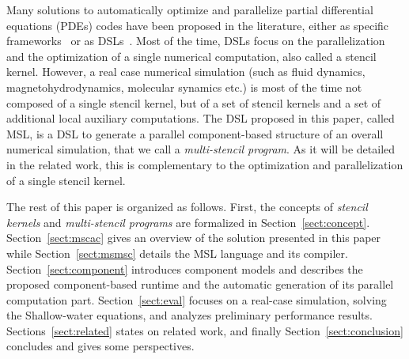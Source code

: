 Many solutions to automatically optimize and parallelize partial differential equations (PDEs) codes have been proposed in the literature, either as specific frameworks~\cite{CPE:CPE3494,Trilinos-Overview,petsc-efficient} or as DSLs~\cite{spaaTangCKLL11,citeulike12258902,Giles2011,DeVito2011LDS}. Most of the time, DSLs focus on the parallelization and the optimization of a single numerical computation, also called a stencil kernel.
However, a real case numerical simulation (such as fluid dynamics, magnetohydrodynamics, molecular synamics etc.) is most of the time not composed of a single stencil kernel, but of a set of stencil kernels and a set of additional local auxiliary computations. The DSL proposed in this paper, called MSL, is a DSL to generate a parallel component-based structure of an overall numerical simulation, that we call a \emph{multi-stencil program}. As it will be detailed in the related work, this is complementary to the optimization and parallelization of a single stencil kernel.

The rest of this paper is organized as follows. First, the concepts of \emph{stencil kernels} and \emph{multi-stencil programs} are formalized in Section~\ref{sect:concept}. Section~\ref{sect:mscac} gives an overview of the solution presented in this paper while Section~\ref{sect:msmsc} details the MSL language and its compiler. Section~\ref{sect:component} introduces component models and describes the proposed component-based runtime and the automatic generation of its parallel computation part.
Section~\ref{sect:eval} focuses on a real-case simulation, solving the Shallow-water equations, and analyzes preliminary performance results. Sections~\ref{sect:related} states on related work, and finally Section~\ref{sect:conclusion} concludes and gives some perspectives.
